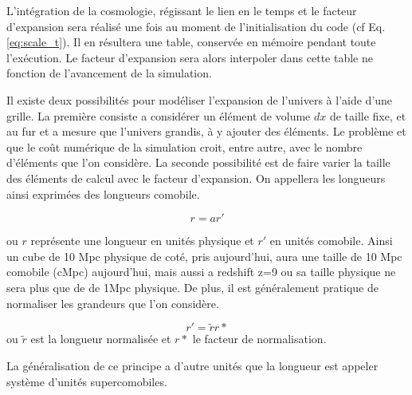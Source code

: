 L'intégration de la cosmologie, régissant le lien en le temps et le facteur d'expansion sera réalisé une fois au moment de l'initialisation du code (cf Eq. \ref{eq:scale_t}).
Il en résultera une table, conservée en mémoire pendant toute l'exécution.
Le facteur d'expansion sera alors interpoler dans cette table ne fonction de l'avancement de la simulation.%

Il existe deux possibilités pour modéliser l'expansion de l'univers à l'aide d'une grille.
La première consiste a considérer un élément de volume $dx$ de taille fixe, et au fur et a mesure que l'univers grandis, à y ajouter des éléments.
Le problème et que le coût numérique de la simulation croit, entre autre, avec le nombre d'éléments que l'on considère.
La seconde possibilité est de faire varier la taille des éléments de calcul avec le facteur d'expansion.
On appellera les longueurs ainsi exprimées des longueurs comobile.

\begin{equation}
r=a r'
\end{equation}

ou $r$ représente une longueur en unités physique et $r'$ en unités comobile.
Ainsi un cube de 10 Mpc physique de coté, pris aujourd'hui, aura une taille de 10 Mpc comobile (cMpc) aujourd'hui, mais aussi a redshift z=9 ou sa taille physique ne sera plus que de de 1Mpc physique.
De plus, il est généralement pratique de normaliser les grandeurs que l'on considère. 

\begin{equation}
r'=\tilde{r}r*
\end{equation}
ou $\tilde{r}$ est la longueur normalisée et $r*$ le facteur de normalisation.

La généralisation de ce principe a d'autre unités que la longueur est appeler système d'unités supercomobiles.
\citep{martel_convenient_1998}

